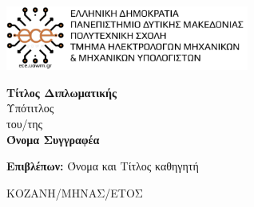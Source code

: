 \begin{titlepage}
 \includegraphics[width=0.6\textwidth]{images/logo}

    \begin{center}
        \vspace*{3cm}
            
        \Huge
        \color{orange}
        \textbf{Τίτλος Διπλωματικής}\\
        \color{black}  
        \vspace{0.5cm}
        \LARGE
        Υπότιτλος\\
        \vspace{0.5cm}
        \small
        του/της\\
            
        \vspace{1.5cm}
        \LARGE    
        \textbf{Όνομα Συγγραφέα}
            
         \vspace{3.5cm}
        \textbf{Επιβλέπων:} Όνομα και Τίτλος καθηγητή
        \vfill    
        \vspace{0.8cm}
            
       
            
        \Large
       ΚΟΖΑΝΗ/ΜΗΝΑΣ/ΕΤΟΣ
       \end{center}

\end{titlepage}
    {\let\cleardoublepage\relax \frontmatter}